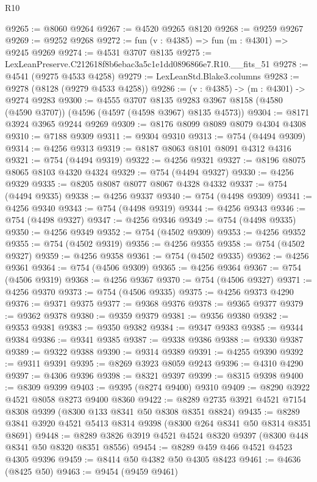\begin{lexlean}{R10}
\begin{coremodule}
@9265 := @8060 @9264
@9267 := @4520 @9265 @8120
@9268 := @9259 @9267
@9269 := @9252 @9268
@9272 := fun (v : @4385) => fun (m : @4301) => @9245 @9269
@9274 := @4531 @3707 @8135
@9275 := LexLeanPreserve.C212618f8b6ebac3a5c1e1dd0896866e7.R10.__fits_51
@9278 := @4541 (@9275 @4533 @4258)
@9279 := LexLeanStd.Blake3.columns
@9283 := @9278 (@8128 (@9279 @4533 @4258))
@9286 := (v : @4385) -> (m : @4301) -> @9274 @9283
@9300 := @4555
    @3707
    @8135
    @9283
    @3967
    @8158
    (@4580 (@4590 @3707))
    (@4596 (@4597 (@4598 @3967) @8135 @4573))
@9304 := @8171 @3924 @3965 @9244 @9269
@9309 := @8176 @8099 @8089 @8079 @4304 @4308
@9310 := @7188 @9309
@9311 := @9304 @9310
@9313 := @754 (@4494 @9309)
@9314 := @4256 @9313
@9319 := @8187 @8063 @8101 @8091 @4312 @4316
@9321 := @754 (@4494 @9319)
@9322 := @4256 @9321
@9327 := @8196 @8075 @8065 @8103 @4320 @4324
@9329 := @754 (@4494 @9327)
@9330 := @4256 @9329
@9335 := @8205 @8087 @8077 @8067 @4328 @4332
@9337 := @754 (@4494 @9335)
@9338 := @4256 @9337
@9340 := @754 (@4498 @9309)
@9341 := @4256 @9340
@9343 := @754 (@4498 @9319)
@9344 := @4256 @9343
@9346 := @754 (@4498 @9327)
@9347 := @4256 @9346
@9349 := @754 (@4498 @9335)
@9350 := @4256 @9349
@9352 := @754 (@4502 @9309)
@9353 := @4256 @9352
@9355 := @754 (@4502 @9319)
@9356 := @4256 @9355
@9358 := @754 (@4502 @9327)
@9359 := @4256 @9358
@9361 := @754 (@4502 @9335)
@9362 := @4256 @9361
@9364 := @754 (@4506 @9309)
@9365 := @4256 @9364
@9367 := @754 (@4506 @9319)
@9368 := @4256 @9367
@9370 := @754 (@4506 @9327)
@9371 := @4256 @9370
@9373 := @754 (@4506 @9335)
@9375 := @4256 @9373 @4290
@9376 := @9371 @9375
@9377 := @9368 @9376
@9378 := @9365 @9377
@9379 := @9362 @9378
@9380 := @9359 @9379
@9381 := @9356 @9380
@9382 := @9353 @9381
@9383 := @9350 @9382
@9384 := @9347 @9383
@9385 := @9344 @9384
@9386 := @9341 @9385
@9387 := @9338 @9386
@9388 := @9330 @9387
@9389 := @9322 @9388
@9390 := @9314 @9389
@9391 := @4255 @9390
@9392 := @9311 @9391
@9395 := @8269 @3923 @8059 @9243
@9396 := @4310 @4290
@9397 := @4306 @9396
@9398 := @8321 @9397
@9399 := @8315 @9398
@9400 := @8309 @9399
@9403 := @9395 (@8274 @9400) @9310
@9409 := @8290 @3922 @4521 @8058 @8273 @9400 @8360
@9422 := @8289 @2735 @3921 @4521 @7154 @8308 @9399 (@8300 @133 @8341 @50 @8308 @8351 @8824)
@9435 := @8289 @3841 @3920 @4521 @5413 @8314 @9398 (@8300 @264 @8341 @50 @8314 @8351 @8691)
@9448 := @8289 @3826 @3919 @4521 @4524 @8320 @9397 (@8300 @448 @8341 @50 @8320 @8351 @8556)
@9454 := @8289 @459 @466 @4521 @4523 @4305 @9396
@9459 := @8414 @50 @4382 @50 @4305 @8423
@9461 := @4636 (@8425 @50)
@9463 := @9454 (@9459 @9461)

\end{coremodule}
\end{lexlean}
